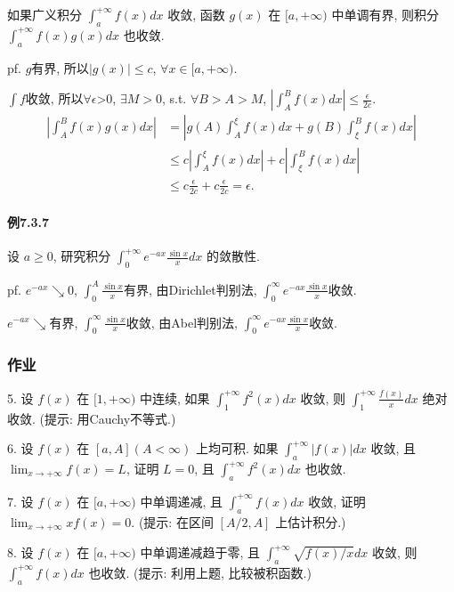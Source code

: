如果广义积分 $\int_{a}^{+\infty}f(x)dx$ 收敛, 函数 $g(x)$ 在 $[a,+\infty)$
中单调有界, 则积分 $\int_{a}^{+\infty}f(x)g(x)dx$ 也收敛.

pf. $g$有界, 所以$\left|g(x)\right|\le c$, $\forall x\in[a,+\infty)$.

$\int f$收敛, 所以$\forall\epsilon$>0, $\exists M>0$, s.t. $\forall B>A>M$,
$\left|\int_{A}^{B}f(x)dx\right|\le\frac{\epsilon}{2c}$. 
\[
\begin{aligned}\left|\int_{A}^{B}f(x)g(x)dx\right| & =\left|g(A)\int_{A}^{\xi}f(x)dx+g(B)\int_{\xi}^{B}f(x)dx\right|\\
	& \leqslant c\left|\int_{A}^{\xi}f(x)dx\right|+c\left|\int_{\xi}^{B}f(x)dx\right|\\
	& \leqslant c\frac{\epsilon}{2c}+c\frac{\epsilon}{2c}=\epsilon.
\end{aligned}
\]


\paragraph{例7.3.7}

设 $a\geqslant0$, 研究积分 $\int_{0}^{+\infty}e^{-ax}\frac{\sin x}{x}dx$
的敛散性.

pf. $e^{-ax}\searrow0$, $\int_{0}^{A}\frac{\sin x}{x}$有界, 由Dirichlet判别法,
$\int_{0}^{\infty}e^{-ax}\frac{\sin x}{x}$收敛.

$e^{-ax}\searrow$有界, $\int_{0}^{\infty}\frac{\sin x}{x}$收敛, 由Abel判别法,
$\int_{0}^{\infty}e^{-ax}\frac{\sin x}{x}$收敛.

\subsubsection{作业}

5. 设 $f(x)$ 在 $[1,+\infty)$ 中连续, 如果 $\int_{1}^{+\infty}f^{2}(x)dx$
收敛, 则 $\int_{1}^{+\infty}\frac{f(x)}{x}dx$ 绝对收敛. (提示: 用Cauchy不等式.)

6. 设 $f(x)$ 在 $[a,A](A<\infty)$ 上均可积. 如果 $\int_{a}^{+\infty}|f(x)|dx$
收敛, 且 $\lim_{x\rightarrow+\infty}f(x)=L$, 证明 $L=0$, 且 $\int_{a}^{+\infty}f^{2}(x)dx$
也收敛.

7. 设 $f(x)$ 在 $[a,+\infty)$ 中单调递减, 且 $\int_{a}^{+\infty}f(x)dx$
收敛, 证明 $\lim_{x\rightarrow+\infty}xf(x)=0$. (提示: 在区间 $[A/2,A]$ 上估计积分.)

8. 设 $f(x)$ 在 $[a,+\infty)$ 中单调递减趋于零, 且 $\int_{a}^{+\infty}\sqrt{f(x)/x}dx$
收敛, 则 $\int_{a}^{+\infty}f(x)dx$ 也收敛. (提示: 利用上题, 比较被积函数.)


